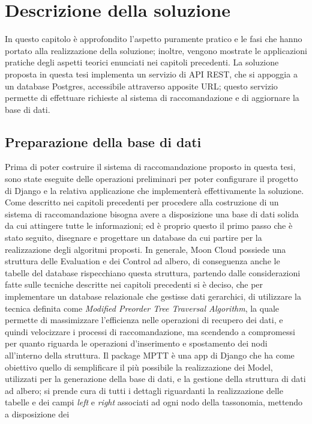 \chapter{Descrizione della soluzione}\label{chp:04-solution}
In questo capitolo è approfondito l'aspetto puramente pratico e le fasi che hanno portato alla realizzazione della soluzione; 
inoltre, vengono mostrate le applicazioni pratiche degli aspetti teorici enunciati nei capitoli precedenti.
%
\vspace{1.5 cm}
\hfill\break
La soluzione proposta in questa tesi implementa un servizio di API REST, che si appoggia a un database Postgres, accessibile 
attraverso apposite URL; questo servizio permette di effettuare richieste al sistema di raccomandazione e di aggiornare la base di dati.
%
\section*{Preparazione della base di dati}
Prima di poter costruire il sistema di raccomandazione proposto in questa tesi, sono state eseguite delle operazioni preliminari 
per poter configurare il progetto di Django e la relativa applicazione che implementerà effettivamente la soluzione. 
Come descritto nei capitoli precedenti per procedere alla costruzione di un sistema di raccomandazione bisogna avere a disposizione 
una base di dati solida da cui attingere tutte le informazioni; ed è proprio questo il primo passo che è stato seguito, disegnare 
e progettare un database da cui partire per la realizzazione degli algoritmi proposti.\hfill\break
In generale, Moon Cloud possiede una struttura delle Evaluation e dei Control ad albero, di conseguenza anche le tabelle del database 
rispecchiano questa struttura, partendo dalle considerazioni fatte sulle tecniche descritte nei capitoli precedenti si è deciso, che 
per implementare un database relazionale che gestisse dati gerarchici, di utilizzare la tecnica
definita come \textit{Modified Preorder Tree Traversal Algorithm}, la quale permette di massimizzare l'efficienza nelle 
operazioni di recupero dei dati, e quindi velocizzare i processi di raccomandazione, ma scendendo a compromessi per quanto riguarda le 
operazioni d'inserimento e spostamento dei nodi all'interno della struttura.\hfill\break
Il package MPTT è una app di Django che ha come obiettivo quello di semplificare il più possibile la realizzazione dei Model, utilizzati 
per la generazione della base di dati, e la gestione della struttura di dati ad albero; si prende cura di tutti i dettagli riguardanti la 
realizzazione delle tabelle e dei campi \textit{left} e \textit{right} associati ad ogni nodo della tassonomia, mettendo a disposizione dei 
